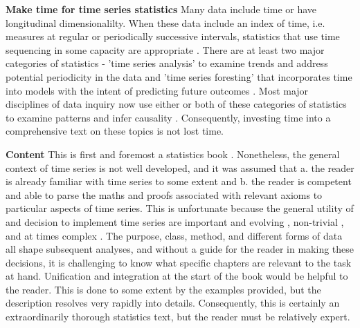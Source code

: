 \documentclass[bookreview]{jss}
\begin{document}
\textbf{Make time for time series statistics} \newline
Many data include time or have longitudinal dimensionalilty. When these data include an index of time, i.e. measures at regular or periodically successive intervals, statistics that use time sequencing in some capacity are appropriate \citep{Senin2009}. There are at least two major categories of statistics - 'time series analysis' to examine trends and address potential periodicity in the data and 'time series foresting' that incorporates time into models with the intent of predicting future outcomes \citep{Senin2009}. Most major disciplines of data inquiry now use either or both of these categories of statistics to examine patterns and infer causality \citep{Gooijer2006}. Consequently, investing time into a comprehensive text on these topics is not lost time.  \newline


\textbf{Content} \newline
This is first and foremost a statistics book \citep{Woodward2017}. Nonetheless, the general context of time series is not well developed, and it was assumed that a. the reader is already familiar with time series to some extent and b. the reader is competent and able to parse the maths and proofs associated with relevant axioms to particular aspects of time series. This is unfortunate because the general utility of and decision to implement time series are important and evolving \citep{Mishra2017}, non-trivial \citep{Webby1996}, and at times complex \citep{Fu2011, Tang2015}. The purpose, class, method, and different forms of data all shape subsequent analyses, and without a guide for the reader in making these decisions, it is challenging to know what specific chapters are relevant to the task at hand. Unification and integration at the start of the book would be helpful to the reader. This is done to some extent by the examples provided, but the description resolves very rapidly into details. Consequently, this is certainly an extraordinarily thorough statistics text, but the reader must be relatively expert. \newline
\end{document}
